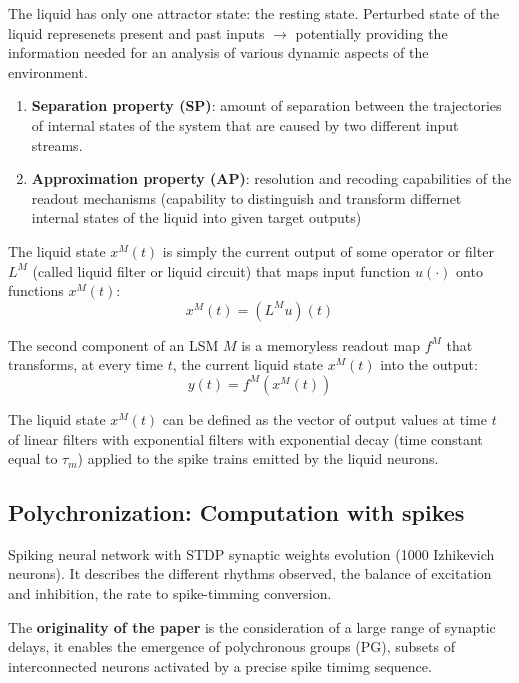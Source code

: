 \documentclass[12pt]{article}
\begin{document}
The liquid has only one attractor state: the resting state. Perturbed state of the liquid represenets present and past inputs $\rightarrow$ potentially providing the information needed for an analysis of various dynamic aspects of the environment.

\begin{enumerate}
\item \textbf{Separation property (SP)}: amount of separation between the trajectories of internal states of the system that are caused by two different input streams.

\item \textbf{Approximation property (AP)}: resolution and recoding capabilities of the readout mechanisms (capability to distinguish and transform differnet internal states of the liquid into given target outputs)


\end{enumerate}

The liquid state $x^M(t)$ is simply the current output of some operator or filter $L^M$ (called liquid filter or liquid circuit) that maps input function $u(\cdot)$ onto functions $x^M(t)$: \begin{equation}
x^M(t) = (L^M u)(t)
\end{equation}

The second component of an LSM $M$ is a memoryless readout map $f^M$ that transforms, at every time $t$, the current liquid state $x^M(t)$ into the output: \begin{equation}
y(t) = f^M(x^M(t))
\end{equation}

The liquid state $x^M(t)$ can be defined as the vector of output values at time $t$ of linear filters with exponential filters with exponential decay (time constant equal to $\tau_m$) applied to the spike trains emitted by the liquid neurons.

\subsection{Polychronization: Computation with spikes \cite{izhikevich2006polychronization}}

Spiking neural network with STDP synaptic weights evolution (1000 Izhikevich neurons). It describes the different rhythms observed, the balance of excitation and inhibition, the rate to spike-timming conversion.

The \textbf{originality of the paper} is the consideration of a large range of synaptic delays, it enables the emergence of polychronous groups (PG), subsets of interconnected neurons activated by a precise spike timimg sequence.
\end{document}
